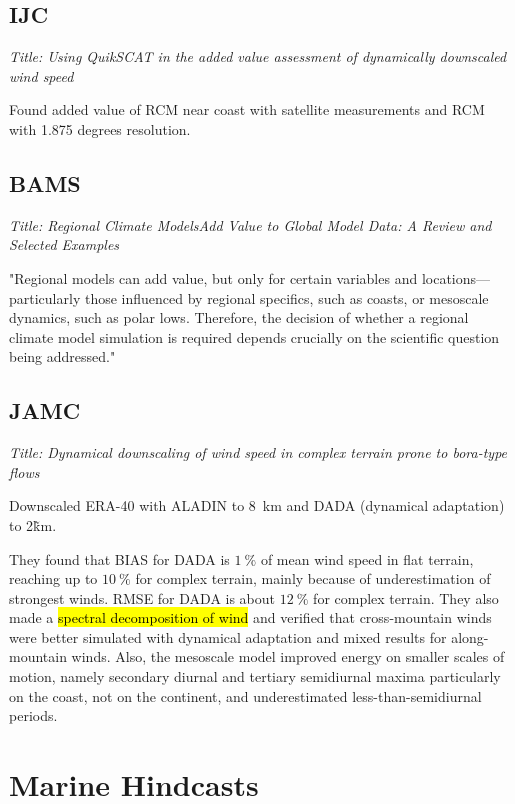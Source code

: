 \documentclass[12pt,a4paper]{article}
\begin{document}
\subsection{\cite{Winterfeldt2011} IJC }

\textit{Title: Using QuikSCAT in the added value assessment of dynamically downscaled wind speed}

Found added value of RCM near coast with satellite measurements and RCM with 1.875 degrees resolution. 

\subsection{\cite{Feser2011} BAMS}

\textit{Title: Regional Climate ModelsAdd Value to Global Model Data: A Review and Selected Examples}

"Regional models can add value, but only for certain variables and locations—particularly those influenced by regional specifics, such as coasts, or mesoscale dynamics, such as polar lows. Therefore, the decision of whether a regional climate model simulation is required depends crucially on the scientific question being addressed."

\subsection{\cite{Horvath2011} JAMC}

\textit{Title: Dynamical downscaling of wind speed in complex terrain prone to bora-type flows}

Downscaled ERA-40 with ALADIN to 8~km and DADA (dynamical adaptation) to 2\~km. 

They found that BIAS for DADA is $1~\%$ of mean wind speed in flat terrain, reaching up to $10~\%$ for complex terrain, mainly because of underestimation of strongest winds. RMSE for DADA is about $12~\%$ for complex terrain. They also made a \hl{spectral decomposition of wind} and verified that cross-mountain winds were better simulated with dynamical adaptation and mixed results for along-mountain winds. Also, the mesoscale model improved energy on smaller scales of motion, namely secondary diurnal and tertiary semidiurnal maxima particularly on the coast, not on the continent, and underestimated less-than-semidiurnal periods.


\section{Marine Hindcasts}
\end{document}
